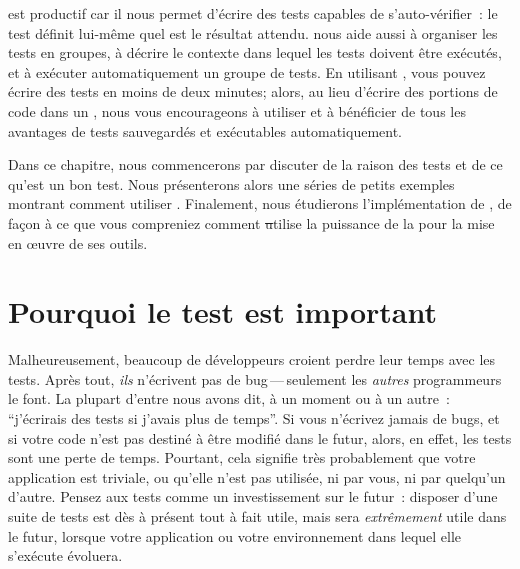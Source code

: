 \documentclass[a4paper,10pt,twoside]{book}
\begin{document}
\sunit est productif car il nous permet d'écrire des tests capables de s'auto-vérifier~: le test définit lui-même quel est le résultat attendu. \sunit nous aide aussi à organiser les tests en groupes, à décrire le contexte dans lequel les tests doivent être exécutés, et à exécuter automatiquement un groupe de tests. En utilisant \sunit, vous pouvez écrire des tests en moins de deux minutes; alors, au lieu d'écrire des portions de code dans un , nous vous encourageons à utiliser \sunit et à bénéficier de tous les avantages de tests sauvegardés et exécutables automatiquement.

Dans ce chapitre, nous commencerons par discuter de la raison des
tests et de ce qu'est un bon test. Nous présenterons alors une séries de petits exemples montrant comment utiliser \sunit. Finalement, nous étudierons l'implémentation de \sunit, de façon à ce que vous compreniez comment \st utilise la puissance de la  pour la mise en \oe uvre de ses outils.


\section{Pourquoi le test est important}
\label{sec:why}

Malheureusement, beaucoup de développeurs croient perdre leur temps avec les tests. 
Après tout, \emph{ils} n'écrivent pas de bug\,---\,seulement les \emph{autres} programmeurs le font. La plupart d'entre nous avons dit, à un moment ou à un autre~: ``j'écrirais des tests si j'avais plus de temps''.
Si vous n'écrivez jamais de bugs, et si votre code n'est pas destiné à être modifié dans le futur, alors, en effet, les tests sont une perte de temps. Pourtant, cela signifie très probablement que votre application est triviale, ou qu'elle n'est pas utilisée, ni par vous, ni par quelqu'un d'autre. Pensez aux tests comme un investissement sur le futur~: disposer d'une suite de tests est dès à présent tout à fait utile, mais sera \emph{extrêmement} utile dans le futur, lorsque votre application ou votre environnement dans lequel elle s'exécute évoluera. 
\end{document}
